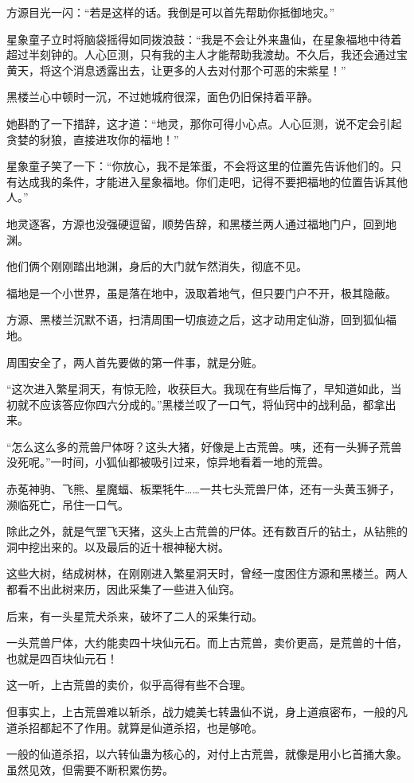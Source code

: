 \begin{this_body}
方源目光一闪：“若是这样的话。我倒是可以首先帮助你抵御地灾。”

星象童子立时将脑袋摇得如同拨浪鼓：“我是不会让外来蛊仙，在星象福地中待着超过半刻钟的。人心叵测，只有我的主人才能帮助我渡劫。不久后，我还会通过宝黄天，将这个消息透露出去，让更多的人去对付那个可恶的宋紫星！”

黑楼兰心中顿时一沉，不过她城府很深，面色仍旧保持着平静。

她斟酌了一下措辞，这才道：“地灵，那你可得小心点。人心叵测，说不定会引起贪婪的豺狼，直接进攻你的福地！”

星象童子笑了一下：“你放心，我不是笨蛋，不会将这里的位置先告诉他们的。只有达成我的条件，才能进入星象福地。你们走吧，记得不要把福地的位置告诉其他人。”

地灵逐客，方源也没强硬逗留，顺势告辞，和黑楼兰两人通过福地门户，回到地渊。

他们俩个刚刚踏出地渊，身后的大门就乍然消失，彻底不见。

福地是一个小世界，虽是落在地中，汲取着地气，但只要门户不开，极其隐蔽。

方源、黑楼兰沉默不语，扫清周围一切痕迹之后，这才动用定仙游，回到狐仙福地。

周围安全了，两人首先要做的第一件事，就是分赃。

“这次进入繁星洞天，有惊无险，收获巨大。我现在有些后悔了，早知道如此，当初就不应该答应你四六分成的。”黑楼兰叹了一口气，将仙窍中的战利品，都拿出来。

“怎么这么多的荒兽尸体呀？这头大猪，好像是上古荒兽。咦，还有一头狮子荒兽没死呢。”一时间，小狐仙都被吸引过来，惊异地看着一地的荒兽。

赤莬神驹、飞熊、星魔蝠、板栗牦牛……一共七头荒兽尸体，还有一头黄玉狮子，濒临死亡，吊住一口气。

除此之外，就是气罡飞天猪，这头上古荒兽的尸体。还有数百斤的钻土，从钻熊的洞中挖出来的。以及最后的近十根神秘大树。

这些大树，结成树林，在刚刚进入繁星洞天时，曾经一度困住方源和黑楼兰。两人都看不出此树来历，因此采集了一些进入仙窍。

后来，有一头星荒犬杀来，破坏了二人的采集行动。

一头荒兽尸体，大约能卖四十块仙元石。而上古荒兽，卖价更高，是荒兽的十倍，也就是四百块仙元石！

这一听，上古荒兽的卖价，似乎高得有些不合理。

但事实上，上古荒兽难以斩杀，战力媲美七转蛊仙不说，身上道痕密布，一般的凡道杀招都起不了作用。就算是仙道杀招，也是够呛。

一般的仙道杀招，以六转仙蛊为核心的，对付上古荒兽，就像是用小匕首捅大象。虽然见效，但需要不断积累伤势。


\end{this_body}
